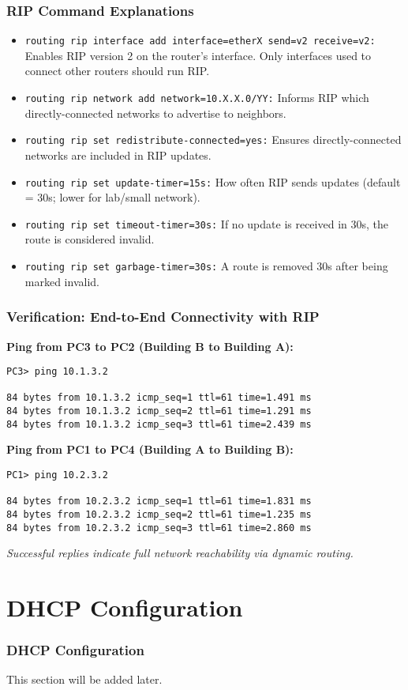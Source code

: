 \documentclass{beamer}
\begin{document}
\begin{frame}[fragile]
\frametitle{RIP Command Explanations}
\begin{itemize}
    \item \texttt{routing rip interface add interface=etherX send=v2 receive=v2:} Enables RIP version 2 on the router’s interface. Only interfaces used to connect other routers should run RIP.
    \item \texttt{routing rip network add network=10.X.X.0/YY:} Informs RIP which directly-connected networks to advertise to neighbors.
    \item \texttt{routing rip set redistribute-connected=yes:} Ensures directly-connected networks are included in RIP updates.
    \item \texttt{routing rip set update-timer=15s:} How often RIP sends updates (default = 30s; lower for lab/small network).
    \item \texttt{routing rip set timeout-timer=30s:} If no update is received in 30s, the route is considered invalid.
    \item \texttt{routing rip set garbage-timer=30s:} A route is removed 30s after being marked invalid.
\end{itemize}
\end{frame}

\begin{frame}[fragile]
\frametitle{Verification: End-to-End Connectivity with RIP}
\textbf{Ping from PC3 to PC2 (Building B to Building A):}
\begin{lstlisting}
PC3> ping 10.1.3.2

84 bytes from 10.1.3.2 icmp_seq=1 ttl=61 time=1.491 ms
84 bytes from 10.1.3.2 icmp_seq=2 ttl=61 time=1.291 ms
84 bytes from 10.1.3.2 icmp_seq=3 ttl=61 time=2.439 ms
\end{lstlisting}
\textbf{Ping from PC1 to PC4 (Building A to Building B):}
\begin{lstlisting}
PC1> ping 10.2.3.2

84 bytes from 10.2.3.2 icmp_seq=1 ttl=61 time=1.831 ms
84 bytes from 10.2.3.2 icmp_seq=2 ttl=61 time=1.235 ms
84 bytes from 10.2.3.2 icmp_seq=3 ttl=61 time=2.860 ms
\end{lstlisting}
\textit{Successful replies indicate full network reachability via dynamic routing.}
\end{frame}

\section{DHCP Configuration}
\begin{frame}[fragile,label=dhcp]
\frametitle{DHCP Configuration}
This section will be added later.
\end{frame}
\end{document}
